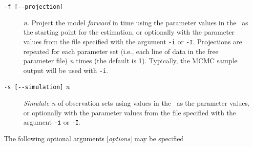 \begin{description}
\item [\texttt{-f [-{}-projection]}] \emph{n}. Project the model \emph{forward} in time using the parameter values in the \config\ as the starting point for the estimation, or optionally with the parameter values from the file specified with the argument \texttt{-i} or \texttt{-I}. Projections are repeated for each parameter set (i.e., each line of data in the free parameter file) \emph{n} times (the default is 1). Typically, the MCMC sample output will be used with \texttt{-i}.

\item [\texttt{-s [-{}-simulation]} \emph{n}] \emph{Simulate} \emph{n} of observation sets using values in the \config\ as the parameter values, or optionally with the parameter values from the file specified with the argument \texttt{-i} or \texttt{-I}.

\end{description}

The following optional arguments [\emph{options}] may be specified

